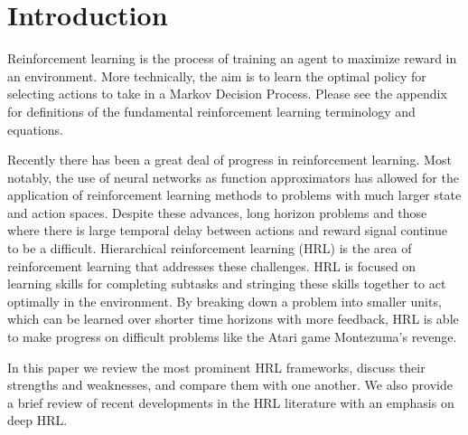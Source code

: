 \section{Introduction}
Reinforcement learning is the process of training an agent to maximize reward in an environment.
More technically, the aim is to learn the optimal policy for selecting actions to take in a Markov Decision Process.
Please see the appendix for definitions of the fundamental reinforcement learning terminology
and equations.

Recently there has been a great deal of progress in reinforcement learning. Most notably,
the use of neural networks as function approximators has allowed for the application of
reinforcement learning methods to problems with much larger state and action spaces.
Despite these advances, long horizon problems  and those where there is large temporal delay between actions and
reward signal continue to be a difficult.
Hierarchical reinforcement learning (HRL) is the area of reinforcement learning that addresses these challenges.
HRL is focused on learning skills for completing subtasks and stringing these skills
together to act optimally in the environment. By breaking down a problem into smaller units, which can be learned
over shorter time horizons with more feedback, HRL is able to make progress on difficult
problems like the Atari game Montezuma's revenge.

In this paper we review the most prominent HRL frameworks, discuss their strengths and
weaknesses, and compare them with one another. We also provide a brief review of recent developments in the
HRL literature with an emphasis on deep HRL.

